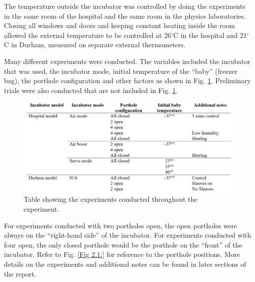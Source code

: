 \documentclass{article}
\begin{document}
\vspace{3mm}

The temperature outside the incubator was controlled by doing the experiments in the same room of the hospital and the same room in the physics laboratories. Closing all windows and doors and keeping constant heating inside the room allowed the external temperature to be controlled at 26$^{\circ}$C in the hospital and 21$^{\circ}$C in Durham, measured on separate external thermometers. 

\vspace{3mm}

Many different experiments were conducted. The variables included the incubator that was used, the incubator mode, initial temperature of the “baby” (freezer bag), the porthole configuration and other factors as shown in Fig. \ref{fig:ExperimentsTable}. Preliminary trials were also conducted that are not included in Fig. \ref{fig:ExperimentsTable}.

\vspace{3mm}


\begin{figure}[H]
    \centering
    \includegraphics[scale = 0.5]{ExperimentsTable.png}
    \captionsetup{justification=centering,margin=1cm}
    \caption{Table showing the experiments conducted throughout the experiment.}
    \label{fig:ExperimentsTable}
\end{figure}



\vspace{3mm}

For experiments conducted with two portholes open, the open portholes were always on the “right-hand side” of the incubator. For experiments conducted with four open, the only closed porthole would be the porthole on the “front” of the incubator. Refer to Fig. \ref{Fig 2.1:} for reference to the porthole positions. More details on the experiments and additional notes can be found in later sections of the report. 
\end{document}
